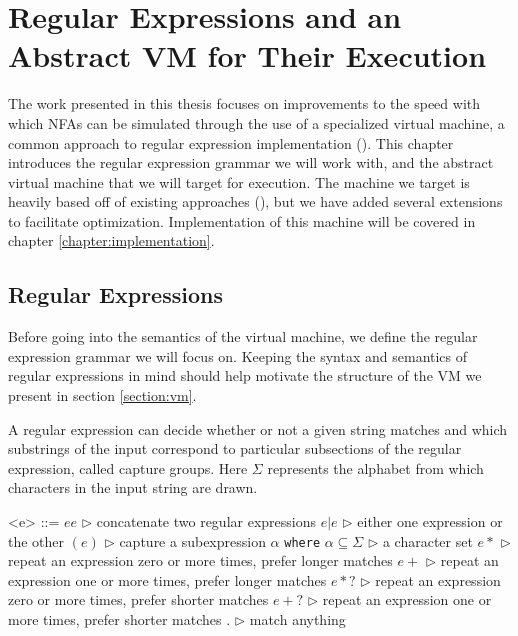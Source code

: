 \chapter{Regular Expressions and an Abstract VM for Their Execution}
\label{chapter:abstractvm}

The work presented in this thesis focuses on improvements to the
speed with which NFAs can be simulated through the use of a
specialized virtual machine, a common approach to regular
expression implementation (\cite{CoxVirtualMachineApproach}).
This chapter introduces the regular expression grammar we will
work with, and the abstract virtual machine that we will target for
execution. The machine we target is heavily based off of existing
approaches (\cite{CoxVirtualMachineApproach}), but we have added several
extensions to facilitate optimization.
Implementation of this machine will be covered in chapter
\ref{chapter:implementation}.

\section{Regular Expressions}
\label{section:regexdef}

Before going into the semantics of the virtual machine, we
define the regular expression grammar we will focus on.
Keeping the syntax and semantics of regular expressions in
mind should help motivate the structure of the VM we present
in section \ref{section:vm}.

A regular expression can decide whether or not a given string
matches and which substrings of the input correspond to particular
subsections of the regular expression, called capture groups.
Here $\Sigma$ represents the alphabet from which characters in
the input string are drawn.

\begin{grammar}
  <e> ::= $e e$ \qquad $\triangleright$ concatenate two regular expressions
  \alt $e \rvert e$ \qquad $\triangleright$ either one expression or the other
  \alt $(e)$ \qquad $\triangleright$ capture a subexpression
  \alt $\alpha$ {\tt where} $\alpha \subseteq \Sigma$
        \qquad $\triangleright$ a character set
  \alt $e*$ \qquad $\triangleright$
                repeat an expression zero or more times, prefer longer matches
  \alt $e+$ \qquad $\triangleright$ 
                repeat an expression one or more times, prefer longer matches
  \alt $e*?$ \qquad $\triangleright$
                repeat an expression zero or more times, prefer shorter matches
  \alt $e+?$ \qquad $\triangleright$
                repeat an expression one or more times, prefer shorter matches
  \alt $.$ \qquad $\triangleright$
                match anything
\end{grammar}

